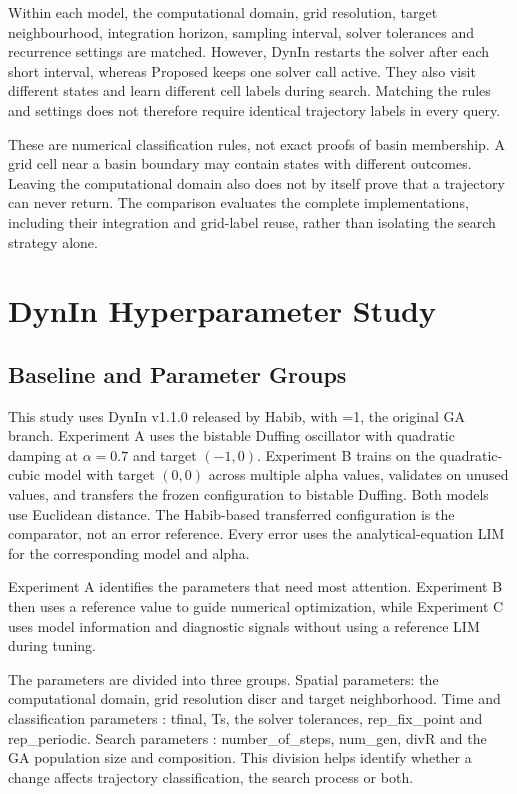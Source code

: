 Within each model, the computational domain, grid resolution, target neighbourhood, integration horizon, sampling interval, solver tolerances and recurrence settings are matched. However, DynIn restarts the solver after each short interval, whereas Proposed keeps one solver call active. They also visit different states and learn different cell labels during search. Matching the rules and settings does not therefore require identical trajectory labels in every query.

These are numerical classification rules, not exact proofs of basin membership. A grid cell near a basin boundary may contain states with different outcomes. Leaving the computational domain also does not by itself prove that a trajectory can never return. The comparison evaluates the complete implementations, including their integration and grid-label reuse, rather than isolating the search strategy alone.

\section{DynIn Hyperparameter Study}

\subsection{Baseline and Parameter Groups}

\begin{bluerevision}
This study uses DynIn v1.1.0 released by Habib, with =1, the original GA branch. Experiment A uses the bistable Duffing oscillator with quadratic damping at $\alpha=0.7$ and target $(-1,0)$. Experiment B trains on the quadratic-cubic model with target $(0,0)$ across multiple alpha values, validates on unused values, and transfers the frozen configuration to bistable Duffing. Both models use Euclidean distance. The Habib-based transferred configuration is the comparator, not an error reference. Every error uses the analytical-equation LIM for the corresponding model and alpha.
\end{bluerevision}

Experiment A identifies the parameters that need most attention. Experiment B then uses a reference value to guide numerical optimization, while Experiment C uses model information and diagnostic signals without using a reference LIM during tuning.

The parameters are divided into three groups. Spatial parameters: the computational domain, grid resolution discr and target neighborhood. Time and classification parameters : tfinal, Ts, the solver tolerances, rep\_fix\_point and rep\_periodic. Search parameters : number\_of\_steps, num\_gen, divR and the GA population size and composition. This division helps identify whether a change affects trajectory classification, the search process or both.

